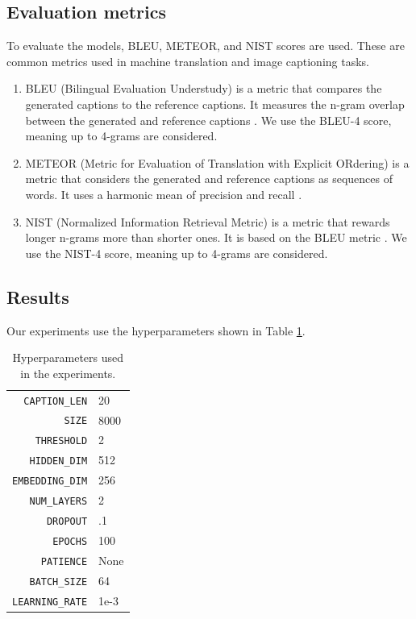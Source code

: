 \documentclass[12pt]{article}
\theoremstyle{plain}
\theoremstyle{definition}
\theoremstyle{remark}
\begin{document}
\subsection{Evaluation metrics}\label{sec:evaluation-metrics}
To evaluate the models, BLEU, METEOR, and NIST scores are used. These are common metrics used in machine translation and image captioning tasks.
\begin{enumerate}
    \item BLEU (Bilingual Evaluation Understudy) is a metric that compares the generated captions to the reference captions. It measures the n-gram overlap between the generated and reference captions \cite{papineni2002bleu}. We use the BLEU-4 score, meaning up to 4-grams are considered.
    \item METEOR (Metric for Evaluation of Translation with Explicit ORdering) is a metric that considers the generated and reference captions as sequences of words. It uses a harmonic mean of precision and recall \cite{banerjee2005meteor}.
    \item NIST (Normalized Information Retrieval Metric) is a metric that rewards longer n-grams more than shorter ones. It is based on the BLEU metric \cite{doddington2002nist}. We use the NIST-4 score, meaning up to 4-grams are considered.
\end{enumerate}

\subsection{Results}\label{sec:results}
Our experiments use the hyperparameters shown in Table \ref{tab:hyperparameters}.
\begin{table}[H]
    \center
    \fontsize{8}{10}\selectfont
    \begin{tabular}{r|l}
        \texttt{CAPTION\_LEN} & 20 \\
        \texttt{SIZE} & 8000 \\
        \texttt{THRESHOLD} & 2 \\
        \texttt{HIDDEN\_DIM} & 512 \\
        \texttt{EMBEDDING\_DIM} & 256 \\
        \texttt{NUM\_LAYERS} & 2 \\
        \texttt{DROPOUT} & .1 \\
        \texttt{EPOCHS} & 100 \\
        \texttt{PATIENCE} & None \\
        \texttt{BATCH\_SIZE} & 64 \\
        \texttt{LEARNING\_RATE} & 1e-3
    \end{tabular}
    \caption{Hyperparameters used in the experiments.}\label{tab:hyperparameters}
\end{table}
\end{document}
